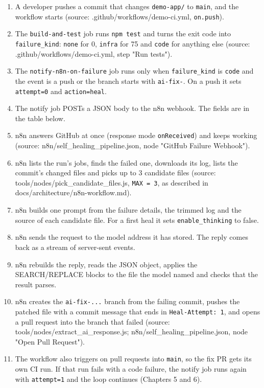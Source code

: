 \documentclass[11pt,a4paper]{report}
\begin{document}
\begin{enumerate}[leftmargin=*,itemsep=2pt]
\item A developer pushes a commit that changes \texttt{demo-\allowbreak{}app/\allowbreak{}} to \texttt{main}, and the workflow starts (source: .github/workflows/demo-ci.yml, \texttt{on.\allowbreak{}push}).
\item The \texttt{build-\allowbreak{}and-\allowbreak{}test} job runs \texttt{npm test} and turns the exit code into \texttt{failure\_\allowbreak{}kind}: \texttt{none} for 0, \texttt{infra} for 75 and \texttt{code} for anything else (source: .github/workflows/demo-ci.yml, step "Run tests").
\item The \texttt{notify-\allowbreak{}n8n-\allowbreak{}on-\allowbreak{}failure} job runs only when \texttt{failure\_\allowbreak{}kind} is \texttt{code} and the event is a push or the branch starts with \texttt{ai-\allowbreak{}fix-\allowbreak{}}. On a push it sets \texttt{attempt=0} and \texttt{action=heal}.
\item The notify job POSTs a JSON body to the n8n webhook. The fields are in the table below.
\item n8n answers GitHub at once (response mode \texttt{onReceived}) and keeps working (source: n8n/self\_healing\_pipeline.json, node "GitHub Failure Webhook").
\item n8n lists the run's jobs, finds the failed one, downloads its log, lists the commit's changed files and picks up to 3 candidate files (source: tools/nodes/pick\_candidate\_files.js, \texttt{MAX = 3}, as described in docs/architecture/n8n-workflow.md).
\item n8n builds one prompt from the failure details, the trimmed log and the source of each candidate file. For a first heal it sets \texttt{enable\_\allowbreak{}thinking} to false.
\item n8n sends the request to the model address it has stored. The reply comes back as a stream of server-sent events.
\item n8n rebuilds the reply, reads the JSON object, applies the SEARCH/REPLACE blocks to the file the model named and checks that the result parses.
\item n8n creates the \texttt{ai-\allowbreak{}fix-\allowbreak{}.\allowbreak{}.\allowbreak{}.\allowbreak{}} branch from the failing commit, pushes the patched file with a commit message that ends in \texttt{Heal-\allowbreak{}Attempt: 1}, and opens a pull request into the branch that failed (source: tools/nodes/extract\_ai\_response.js; n8n/self\_healing\_pipeline.json, node "Open Pull Request").
\item The workflow also triggers on pull requests into \texttt{main}, so the fix PR gets its own CI run. If that run fails with a code failure, the notify job runs again with \texttt{attempt=1} and the loop continues (Chapters 5 and 6).
\end{enumerate}
\end{document}
